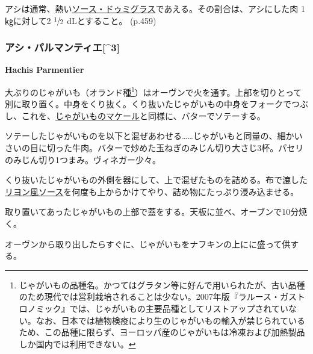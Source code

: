 アシは通常、熱い\protect\hyperlink{sauce-demi-glace}{ソース・ドゥミグラス}であえる。その割合は、アシにした肉
1 ㎏に対して2 \(\sfrac{1}{2}\) dLとすること。 (p.459)
\begin{recette}
\hypertarget{hachis-parmentier}{%
\subsubsection{アシ・パルマンティエ{[}\^{}3{]}}\label{hachis-parmentier}}

\begin{spacing}{0.2}\bfseries Hachis Parmentier\end{spacing}\normalfont\normalsize\setlength{\leftskip}{0pt}\par\vspace{1.1\zw}


大ぶりのじゃがいも（オランド種\footnote{じゃがいもの品種名。かつてはグラタン等に好んで用いられたが、古い品種のため現代では営利栽培されることは少ない。2007年版『ラルース・ガストロノミック』では、じゃがいもの主要品種としてリストアップされていない。なお、日本では植物検疫により生のじゃがいもの輸入が禁じられているため、この品種に限らず、ヨーロッパ産のじゃがいもは冷凍および加熱製品しか国内では利用できない。}）はオーヴンで火を通す。上部を切りとって別に取り置く。中身をくり抜く。くり抜いたじゃがいもの中身をフォークでつぶし、これを、\protect\hyperlink{pommes-de-terre-macaire}{じゃがいものマケール}と同様に、バターでソテーする。

ソテーしたじゃがいものを以下と混ぜあわせる\ldots{}\ldots{}じゃがいもと同量の、細かいさいの目に切った牛肉。バターで炒めた玉ねぎのみじん切り大さじ3杯。パセリのみじん切り1つまみ。ヴィネガー少々。

くり抜いたじゃがいもの外側を器にして、上で混ぜたものを詰める。布で漉した\protect\hyperlink{sauce-lyonnaise}{リヨン風ソース}を何度も上からかけてやり、詰め物にたっぷり浸み込ませる。

取り置いてあったじゃがいもの上部で蓋をする。天板に並べ、オーブンで10分焼く。

オーヴンから取り出したらすぐに、じゃがいもをナフキンの上にに盛って供する。

\hypertarget{pommes-de-terre-macaire}{%
}
\end{recette}
